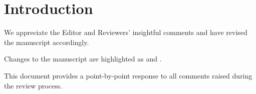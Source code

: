 
\noindent\hrulefill
{}

\section*{Introduction}

We appreciate the Editor and Reviewers' insightful comments and have revised the manuscript accordingly.



Changes to the manuscript are highlighted as  and .

This document provides a point-by-point response to all comments raised during the review process.

